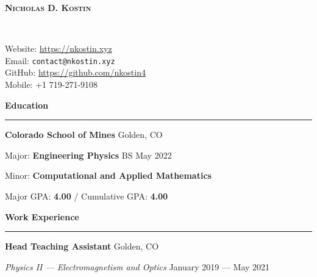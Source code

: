 \documentclass{article}
\numberwithin{equation}{section}
\begin{document}
\begin{minipage}{0.63\textwidth}
\begin{flushleft}
\textsc{\Huge{\textbf{Nicholas D. Kostin}}}
\end{flushleft}
\end{minipage}
~
\begin{minipage}{0.35\textwidth}
\begin{flushright}
\parbox[c]{\textwidth}{Website: \url{https://nkostin.xyz} \\ Email: \texttt{contact@nkostin.xyz} \\ GitHub: \url{https://github.com/nkostin4} \\ Mobile: +1 719-271-9108}
\end{flushright}
\end{minipage}

\vspace{1em}

\textbf{\Large{Education}} \\[-0.5em]
\rule{\textwidth}{1pt}

\hspace{1.5em} \textbf{Colorado School of Mines} \hfill Golden, CO

\hspace{1.5em} Major: \textbf{Engineering Physics} \hfill BS May 2022

\hspace{1.5em} Minor: \textbf{Computational and Applied Mathematics}

\vspace{1em}

\hspace{1.5em} Major GPA: \textbf{4.00} / Cumulative GPA: \textbf{4.00}

\vspace{1em}

\textbf{\Large{Work Experience}} \\[-0.5em]
\rule{\textwidth}{1pt}

\hspace{1.5em} \textbf{Head Teaching Assistant} \hfill Golden, CO

\hspace{1.5em} \textit{Physics II --- Electromagnetism and Optics} \hfill January 2019 --- May 2021
\end{document}
